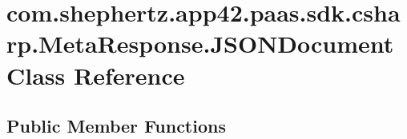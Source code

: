 \hypertarget{classcom_1_1shephertz_1_1app42_1_1paas_1_1sdk_1_1csharp_1_1_meta_response_1_1_j_s_o_n_document}{\section{com.\+shephertz.\+app42.\+paas.\+sdk.\+csharp.\+Meta\+Response.\+J\+S\+O\+N\+Document Class Reference}
\label{classcom_1_1shephertz_1_1app42_1_1paas_1_1sdk_1_1csharp_1_1_meta_response_1_1_j_s_o_n_document}
}


 


\subsection*{Public Member Functions}
